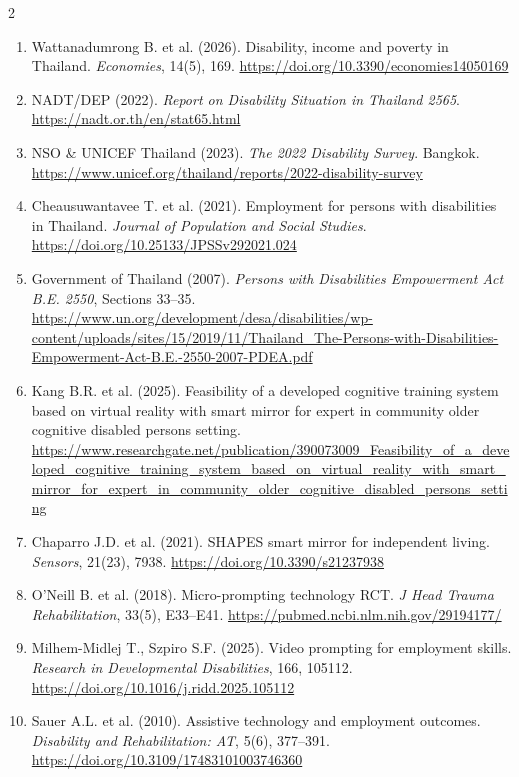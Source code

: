   \item {}

    {\footnotesize
    \setlength{\columnsep}{1.1em}
    \begin{multicols}{2}
    \begin{enumerate}[label=\arabic*.,leftmargin=1.4em,itemsep=0pt,parsep=0pt,topsep=0pt]
      \item Wattanadumrong B. et al. (2026). Disability, income and poverty in Thailand. \emph{Economies}, 14(5), 169. \url{https://doi.org/10.3390/economies14050169}
      \item NADT/DEP (2022). \emph{Report on Disability Situation in Thailand 2565}. \url{https://nadt.or.th/en/stat65.html}
      \item NSO \& UNICEF Thailand (2023). \emph{The 2022 Disability Survey}. Bangkok. \url{https://www.unicef.org/thailand/reports/2022-disability-survey}
      \item Cheausuwantavee T. et al. (2021). Employment for persons with disabilities in Thailand. \emph{Journal of Population and Social Studies}. \url{https://doi.org/10.25133/JPSSv292021.024}
      \item Government of Thailand (2007). \emph{Persons with Disabilities Empowerment Act B.E. 2550}, Sections 33--35. \url{https://www.un.org/development/desa/disabilities/wp-content/uploads/sites/15/2019/11/Thailand_The-Persons-with-Disabilities-Empowerment-Act-B.E.-2550-2007-PDEA.pdf}
      \item Kang B.R. et al. (2025). Feasibility of a developed cognitive training system based on virtual reality with smart mirror for expert in community older cognitive disabled persons setting. \url{https://www.researchgate.net/publication/390073009_Feasibility_of_a_developed_cognitive_training_system_based_on_virtual_reality_with_smart_mirror_for_expert_in_community_older_cognitive_disabled_persons_setting}
      \item Chaparro J.D. et al. (2021). SHAPES smart mirror for independent living. \emph{Sensors}, 21(23), 7938. \url{https://doi.org/10.3390/s21237938}
      \item O'Neill B. et al. (2018). Micro-prompting technology RCT. \emph{J Head Trauma Rehabilitation}, 33(5), E33--E41. \url{https://pubmed.ncbi.nlm.nih.gov/29194177/}
      \item Milhem-Midlej T., Szpiro S.F. (2025). Video prompting for employment skills. \emph{Research in Developmental Disabilities}, 166, 105112. \url{https://doi.org/10.1016/j.ridd.2025.105112}
      \item Sauer A.L. et al. (2010). Assistive technology and employment outcomes. \emph{Disability and Rehabilitation: AT}, 5(6), 377--391. \url{https://doi.org/10.3109/17483101003746360}

\end{enumerate}
\end{multicols}}
